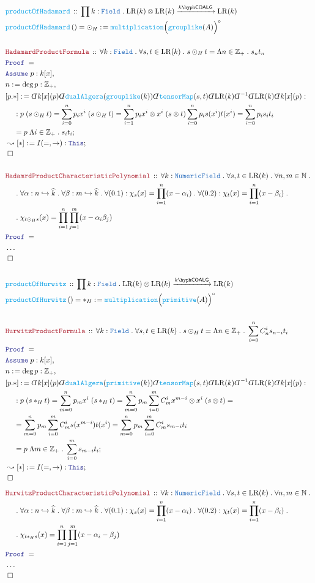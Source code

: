 \documentclass[12pt]{scrartcl}%
\newcommand{\TYPE}[1]{\textcolor{NavyBlue}{\mathtt{#1}}}%
\newcommand{\FUNC}[1]{\textcolor{Cerulean}{\mathtt{#1}}}%
\newcommand{\LOGIC}[1]{\textcolor{Blue}{\mathtt{#1}}}%
\newcommand{\THM}[1]{\textcolor{Maroon}{\mathtt{#1}}}%
\renewcommand{\.}{\; . \;} %
\newcommand{\de}{: \kern 0.1pc =} %
\newcommand{\Act}[1]{\left( #1 \right)} %
\newcommand{\Theorem}[2]{& \THM{#1} \, :: \, #2 \\ & \Proof = \\ } %
\newcommand{\DeclareFunc}[2]{& \FUNC{#1} \, :: \, #2 \\}%
\newcommand{\DefineNamedFunc}[4]{&  \FUNC{#1}\Act{#2} = #3 \de #4 \\}%
\newcommand{\NewLine}{\\ & \kern 1pc}%
\newcommand{\Page}[1]{ \begin{align*} #1 \end{align*}  }%
\newcommand{ \bd }{ \ByDef }%
\newcommand{\NoProof}{ & \ldots \\ \EndProof}%
\newcommand{\Int}{\mathbb{Z}}%
\newcommand{\Nat}{\mathbb{N}}%
\newcommand{\ToInj}{\hookrightarrow} %
\newcommand{\Say}[3]{& #1 \de #2 : #3, \\} %
\newcommand{\Conclude}[3]{& #1 \de #2 : #3; \\}%
\newcommand{\DeriveConclude}[3]{& \leadsto #1 \de #2 : #3 ; \\} %
\newcommand{\Assume}[2]{& \LOGIC{Assume} \; #1 : #2, \\} %
\newcommand{\QED}{\; \square} %
\newcommand{\EndProof}{& \QED \\} %
\newcommand{\ByDef}{\rotatebox[origin=c]{-180}{$D$}}%
\newcommand{\Proof}{\LOGIC{Proof} \; } %
\newcommand{\Arrow}[1]{\xrightarrow{#1}}%
\newcommand{\Field}{\TYPE{Field}}
\newcommand{\COALG}[1]{#1\hyph\mathsf{COALG}}%
\begin{document}
\Page{
	\DeclareFunc{productOfHadamard}{\prod k : \Field \. \mathrm{LR}(k) \otimes \mathrm{LR}(k) \Arrow{\COALG{k}} \mathrm{LR}(k)}
	\DefineNamedFunc{productOfHadamard}{}{\odot_H}{\FUNC{multiplication}\Big(\FUNC{grouplike}(A)\Big)^\circ}
	\\
	\Theorem{HadamardProductFormula}
	{
		\forall k : \Field \. 
		\forall s,t \in \mathrm{LR}(k) \.
		s \odot_H t = \Lambda n \in \Int_+ \. s_n t_n
	}
	\Assume{p}{k[x]}
	\Say{n}{\deg p}{\Int_+}
	\Conclude{[p.*]}{ 
		\bd k[x](p) 
		\bd \FUNC{dualAlgera}(\FUNC{grouplike}(k))
		\bd \FUNC{tensorMap}(s,t)
		\bd \mathrm{LR}(k) 
		\bd^{-1} \bd \mathrm{LR}(k)
		\bd k[x] (p)
	}
	{  
		\NewLine :
		p \; (s \odot_H t) =
		\sum^{n}_{i=0} p_i x^i \; (s \odot_H t) =
		\sum^n_{i=1} p_i x^i \otimes x^i \; (s \otimes t)
		\sum^n_{i=0}  p_i  s(x^i) t(x^i) = 
		\sum^n_{i=0} p_i s_i t_i  \NewLine = 
		p \; \Lambda i \in \Int_+ \.  s_it_i
	}
	\DeriveConclude{[*]}{I(=,\to)}{\LOGIC{This}}
	\EndProof
	\\
	\Theorem{HadamrdProductCharacteristicPolynomial}
	{
		\forall k : \TYPE{NumericField} \.
		\forall s,t \in \mathrm{LR}(k) \.
		\forall n,m \in \Nat \. \NewLine \. 
		\forall \alpha :  n \ToInj \widehat{k} \.
		\forall \beta  :  m \ToInj \widehat{k} \.
		\forall (0.1) : \chi_s(x) = \prod^n_{i=1} (x - \alpha_i) \.
		\forall (0.2) : \chi_t(x) = \prod^n_{i=1} (x - \beta_i)  \. \NewLine \.
		\chi_{t \odot_H s}(x)  =  \prod^n_{i=1} \prod^m_{j=1} (x - \alpha_i \beta_j)
	}
	\NoProof
	\\
	\DeclareFunc{productOfHurwitz}{\prod k : \Field \. \mathrm{LR}(k) \otimes \mathrm{LR}(k) \Arrow{\COALG{k}} \mathrm{LR}(k)}
	\DefineNamedFunc{productOfHurwitz}{}{*_H}{\FUNC{multiplication}\Big(\FUNC{primitive}(A)\Big)^\circ}
	\\
	\Theorem{HurwitzProductFormula}
	{
		\forall k : \Field \. 
		\forall s,t \in \mathrm{LR}(k) \.
		s \odot_H t = \Lambda n \in \Int_+ \. \sum^n_{i=0} C^i_n s_{n-i} t_i
	}
	\Assume{p}{k[x]}
	\Say{n}{\deg p}{\Int_+}
	\Conclude{[p.*]}{ 
		\bd k[x](p) 
		\bd \FUNC{dualAlgera}(\FUNC{primitive}(k))
		\bd \FUNC{tensorMap}(s,t)
		\bd \mathrm{LR}(k) 
		\bd^{-1} \bd \mathrm{LR}(k)
		\bd k[x] (p)
	}
	{  
		\NewLine :
		p \; (s *_H t) =
		\sum^{n}_{m=0} p_m x^i \; (s *_H t) =
		\sum^n_{m=0} p_m \sum^m_{i=0} C^i_m x^{m-i} \otimes x^i \; (s \otimes t) = \NewLine = 
		\sum^n_{m=0} p_m \sum^m_{i=0} C^i_m  s(x^{m-i}) t(x^i) = 
		\sum^n_{m=0} p_m \sum^m_{i=0} C^i_m  s_{m-i} t_i  \NewLine = 
		p \; \Lambda m \in \Int_+ \. \sum^m_{i=0}  s_{m-i}t_i
	}
	\DeriveConclude{[*]}{I(=,\to)}{\LOGIC{This}}
	\EndProof
}\Page{
	\Theorem{HurwitzProductCharacteristicPolynomial}
	{
		\forall k : \TYPE{NumericField} \.
		\forall s,t \in \mathrm{LR}(k) \.
		\forall n,m \in \Nat \. \NewLine \. 
		\forall \alpha :  n \ToInj \widehat{k} \.
		\forall \beta  :  m \ToInj \widehat{k} \.
		\forall (0.1) : \chi_s(x) = \prod^n_{i=1} (x - \alpha_i) \.
		\forall (0.2) : \chi_t(x) = \prod^n_{i=1} (x - \beta_i)  \. \NewLine \.
		\chi_{t *_H s}(x)  =  \prod^n_{i=1} \prod^m_{j=1} (x - \alpha_i - \beta_j)
	}
	\NoProof
}
\newpage
\end{document}
